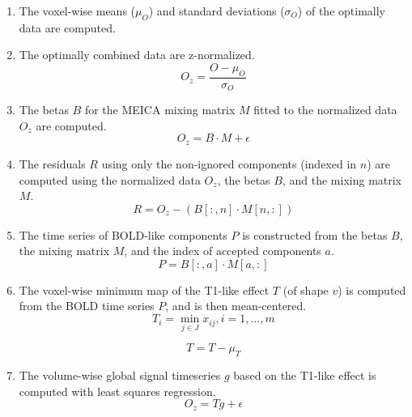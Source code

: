 \documentclass[10pt]{article}
\begin{document}
\begin{enumerate}

  \item
  The voxel-wise means ($\mu_{O}$) and standard deviations ($\sigma_{O}$)
  of the optimally data are computed.

  \item
  The optimally combined data are z-normalized.
    \begin{equation}
      O_{z} = \frac{O - \mu_{O}}{\sigma_{O}}
    \end{equation}

  \item
  The betas $B$ for the MEICA mixing matrix $M$ fitted to the normalized data
  $O_{z}$ are computed.
    \begin{equation}
      O_{z} = B \cdot M + \epsilon
    \end{equation}

  \item
  The residuals $R$ using only the non-ignored components (indexed in $n$) are
  computed using the normalized data $O_{z}$, the betas $B$, and the mixing
  matrix $M$.
    \begin{equation}
      R = O_{z} - (B[:, n] \cdot M[n, :])
    \end{equation}

  \item
  The time series of BOLD-like components $P$ is constructed from the betas $B$,
  the mixing matrix $M$, and the index of accepted components $a$.
    \begin{equation}
      P = B[:, a] \cdot M[a, :]
    \end{equation}

  \item
  The voxel-wise minimum map of the T1-like effect $T$ (of shape $v$) is
  computed from the BOLD time series $P$, and is then mean-centered.
    \begin{equation}
      T_{i} = \min_{j\in{J}}x_{ij}, i = 1,...,m
    \end{equation}

    \begin{equation}
      T = T - \mu_{T}
    \end{equation}

  \item
  The volume-wise global signal timeseries $g$ based on the T1-like effect is
  computed with least squares regression.
    \begin{equation}
      O_{z} = Tg + \epsilon
    \end{equation}


\end{enumerate}
\end{document}
